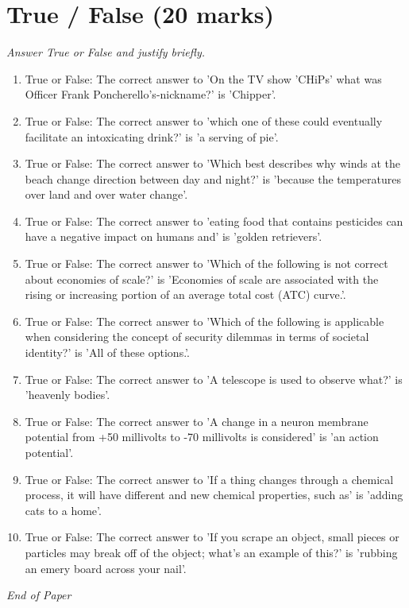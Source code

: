 \documentclass[12pt]{article}
\begin{document}
\section*{True / False (20 marks)}
\textit{Answer True or False and justify briefly.}
\begin{enumerate}[label=\arabic*.]
\item True or False: The correct answer to 'On the TV show 'CHiPs' what was Officer Frank Poncherello's-nickname?' is 'Chipper'.
\item True or False: The correct answer to 'which one of these could eventually facilitate an intoxicating drink?' is 'a serving of pie'.
\item True or False: The correct answer to 'Which best describes why winds at the beach change direction between day and night?' is 'because the temperatures over land and over water change'.
\item True or False: The correct answer to 'eating food that contains pesticides can have a negative impact on humans and' is 'golden retrievers'.
\item True or False: The correct answer to 'Which of the following is not correct about economies of scale?' is 'Economies of scale are associated with the rising or increasing portion of an average total cost (ATC) curve.'.
\item True or False: The correct answer to 'Which of the following is applicable when considering the concept of security dilemmas in terms of societal identity?' is 'All of these options.'.
\item True or False: The correct answer to 'A telescope is used to observe what?' is 'heavenly bodies'.
\item True or False: The correct answer to 'A change in a neuron membrane potential from +50 millivolts to -70 millivolts is considered' is 'an action potential'.
\item True or False: The correct answer to 'If a thing changes through a chemical process, it will have different and new chemical properties, such as' is 'adding cats to a home'.
\item True or False: The correct answer to 'If you scrape an object, small pieces or particles may break off of the object; what's an example of this?' is 'rubbing an emery board across your nail'.
\end{enumerate}

\vfill
\noindent\textit{End of Paper}
\end{document}
